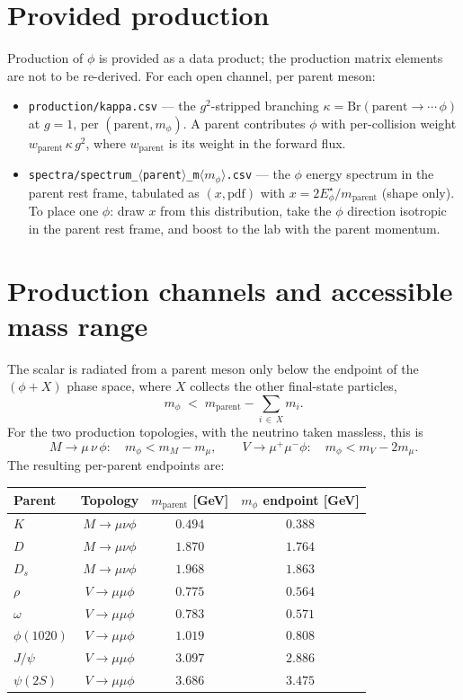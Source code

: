 \documentclass[11pt]{article}
\begin{document}
\section*{Provided production}

Production of $\phi$ is provided as a data product; the production matrix
elements are not to be re-derived. For each open channel, per parent meson:
\begin{itemize}
\item \texttt{production/kappa.csv} --- the $g^2$-stripped branching
  $\kappa = \mathrm{Br}(\text{parent}\to\cdots\,\phi)$ at $g=1$, per
  $(\text{parent}, m_\phi)$. A parent contributes $\phi$ with per-collision
  weight $w_{\text{parent}}\,\kappa\,g^2$, where $w_{\text{parent}}$ is its
  weight in the forward flux.
\item \texttt{spectra/spectrum\_$\langle$parent$\rangle$\_m$\langle m_\phi\rangle$.csv}
  --- the $\phi$ energy spectrum in the parent rest frame, tabulated as
  $(x, \mathrm{pdf})$ with $x = 2E_\phi^\star/m_{\text{parent}}$ (shape only).
  To place one $\phi$: draw $x$ from this distribution, take the $\phi$
  direction isotropic in the parent rest frame, and boost to the lab with the
  parent momentum.
\end{itemize}

\section*{Production channels and accessible mass range}

The scalar is radiated from a parent meson only below the endpoint of the
$(\phi + X)$ phase space, where $X$ collects the other final-state particles,
\[
m_\phi \;<\; m_{\text{parent}} - \sum_{i\,\in\,X} m_i .
\]
For the two production topologies, with the neutrino taken massless, this is
\[
M \to \mu\,\nu\,\phi:\quad m_\phi < m_M - m_\mu ,
\qquad
V \to \mu^+\mu^-\phi:\quad m_\phi < m_V - 2 m_\mu .
\]
The resulting per-parent endpoints are:

\begin{center}
\begin{tabular}{@{}lccc@{}}
\toprule
Parent & Topology & $m_{\text{parent}}$ [GeV] & $m_\phi$ endpoint [GeV] \\
\midrule
$K$          & $M\to\mu\nu\phi$ & $0.494$ & $0.388$ \\
$D$          & $M\to\mu\nu\phi$ & $1.870$ & $1.764$ \\
$D_s$        & $M\to\mu\nu\phi$ & $1.968$ & $1.863$ \\
$\rho$       & $V\to\mu\mu\phi$ & $0.775$ & $0.564$ \\
$\omega$     & $V\to\mu\mu\phi$ & $0.783$ & $0.571$ \\
$\phi(1020)$ & $V\to\mu\mu\phi$ & $1.019$ & $0.808$ \\
$J/\psi$     & $V\to\mu\mu\phi$ & $3.097$ & $2.886$ \\
$\psi(2S)$   & $V\to\mu\mu\phi$ & $3.686$ & $3.475$ \\
\bottomrule
\end{tabular}
\end{center}
\end{document}
